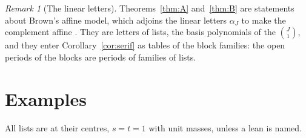 \documentclass[11pt]{article}
\theoremstyle{plain}
\theoremstyle{definition}
\theoremstyle{remark}
\newtheorem{rem}[prop]{Remark}
\begin{document}
\begin{rem}[The linear letters]
Theorems~\ref{thm:A} and~\ref{thm:B} are statements about Brown's affine model, which adjoins the linear letters $\alpha_J$ to make the complement affine \cite[\S5]{B2}. They are letters of lists, the basis polynomials of the $\binom J1$, and they enter Corollary~\ref{cor:serif} as tables of the block families: the open periods of the blocks are periods of families of lists.
\end{rem}

\section{Examples}\label{sec:examples}

All lists are at their centres, $s=t=1$ with unit masses, unless a lean is named.
\end{document}

